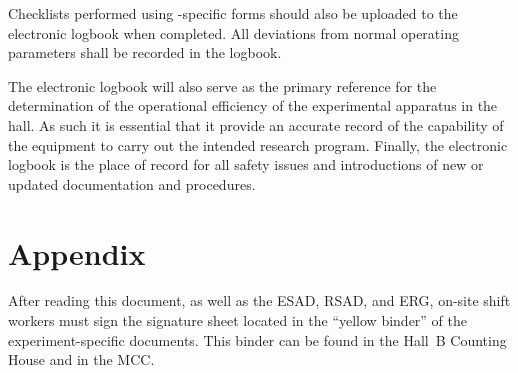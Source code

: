 \documentclass[11pt]{article}
\begin{document}
Checklists performed using \HALL-specific forms should also be uploaded to the
electronic logbook when completed. All deviations from normal 
operating parameters shall be recorded in the logbook. 

The electronic logbook will also serve as the primary reference for the
determination of the operational efficiency of the experimental apparatus in
the hall. As such it is essential that it provide an accurate record of the 
capability of the equipment to carry out the intended research program. 
Finally, the electronic logbook is the place of record for all safety issues and 
introductions of new or updated documentation and procedures.

\section{Appendix}

After reading this document, as well as the ESAD, RSAD, and ERG, on-site shift workers must
sign the signature sheet located in the ``yellow binder'' of the experiment-specific documents.
This binder can be found in the Hall~B Counting House and in the MCC. 
\end{document}
